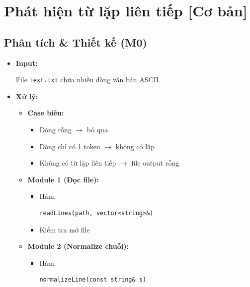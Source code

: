 \section{Phát hiện từ lặp liên tiếp [Cơ bản]}
\subsection{Phân tích \& Thiết kế (M0)}

\begin{itemize}

    \item \textbf{Input:}

    File \texttt{text.txt} chứa nhiều dòng văn bản ASCII.

    \item \textbf{Xử lý:}

    \begin{itemize}

        \item \textbf{Case biên:}

        \begin{itemize}
            \item Dòng rỗng $\rightarrow$ bỏ qua
            \item Dòng chỉ có 1 token $\rightarrow$ không có lặp
            \item Không có từ lặp liên tiếp
            $\rightarrow$
            file output rỗng
        \end{itemize}

        \item \textbf{Module 1 (Đọc file):}

        \begin{itemize}
            \item Hàm:
\begin{lstlisting}
readLines(path, vector<string>&)
\end{lstlisting}

            \item Kiểm tra mở file
        \end{itemize}

        \item \textbf{Module 2 (Normalize chuỗi):}

        \begin{itemize}
            \item Hàm:
\begin{lstlisting}
normalizeLine(const string& s)
\end{lstlisting}


\end{itemize}
\end{itemize}
\end{itemize}
